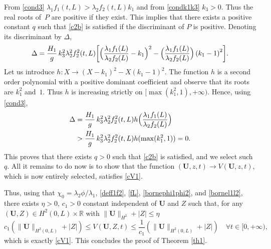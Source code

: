 From \eqref{cond3} $\lambda_{1}f_{1}(t,L)>\lambda_{2}f_{2}(t,L)k_{1}$ and from \eqref{condk1k3} $k_{3}>0$. Thus the real roots of~$P$ are positive if they exist. This implies that there exists a positive constant $q$ such that \eqref{c2b} is satisfied if the discriminant of $P$
is positive. Denoting its discriminant by $\Delta$,
\begin{equation*}
\Delta=\frac{H_{1}}{g}\,k_{3}^{2}\lambda_{2}^{2}f_{2}^{2}(t,L)\biggl[\Bigl(\frac{\lambda_{1}f_{1}(L)}{\lambda_{2}f_{2}(L)}-k_{1} \Bigr)^{2}-\Bigl(\frac{\lambda_{1}f_{1}(L)}{\lambda_{2}f_{2}(L)} \Bigr)\left(k_{1}-1\right)^{2}\biggr].
\end{equation*}
Let us introduce $h:X\to (X-k_{1})^{2}-X(k_{1}-1)^{2}$. The function $h$ is a second order polynomial with a positive dominant coefficient and observe that its roots are
$k_{1}^{2}$ and~$1$. Thus
$h$ is increasing strictly on $[\max(k_{1}^{2},1),+\infty)$.
Hence, using \eqref{cond3},
\begin{equation*}
\begin{split}
\Delta&=\frac{H_{1}}{g}\,k_{3}^{2}\lambda_{2}^{2}f_{2}^{2}(t,L)h \Bigl(\frac{\lambda_{1}f_{1}(L)}{\lambda_{2}f_{2}(L)} \Bigr)\\
&>\frac{H_{1}}{g}\,k_{3}^{2}\lambda_{2}^{2}f_{2}^{2}(t,L)h(\max(k_{1}^{2},1))
=0.
\end{split}
\end{equation*}
This proves that there exists $q>0$ such that \eqref{c2b} is satisfied, and we select such $q$.
All it remains to do now is to show that the function $(\boldsymbol{U},z,{t})\to V(\boldsymbol{U},z,{t})$, which is now entirely selected, satisfies \eqref{cV1}.

Thus, using that $\chi_{0}=\lambda_{2}\phi/\lambda_{1}$, \eqref{deff1f2}, \eqref{fL}, \eqref{bornephi1phi2}, and \eqref{bornel1l2}, there exists $\eta>0$, $c_{1}>0$ constant independent of $\boldsymbol{U}$ and ${Z}$ such that, for any $(\boldsymbol{U},{Z})\in H^{2}(0,L)\times \mathbb{R}$ {with $\|\boldsymbol{U}\|_{H^{2}}+|Z|\leq \eta$}
\begin{equation*}
c_{1}\left(\lVert \boldsymbol{U}\rVert_{H^{2}(0,L)}+|Z|\right) \leq V(\boldsymbol{U},Z,{t})\leq \frac{1}{c_{1}}\left(\lVert \boldsymbol{U}\rVert_{H^{2}(0,L)}+|Z|\right)\quad\forall t\in[0,+\infty),
\end{equation*}
which is exactly \eqref{cV1}. This concludes the proof of Theorem \ref{th1}.
